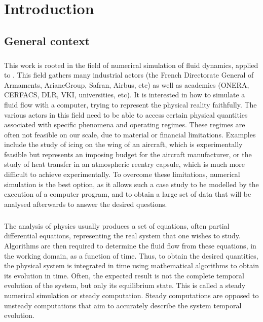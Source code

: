 \chapter*{Introduction}


  \section*{General context}

    \paragraph{}
    This work is rooted in the field of numerical simulation of fluid dynamics, applied to .
    This field gathers many industrial actors (the French Directorate General of Armaments, ArianeGroup, Safran, Airbus, etc) as well as academics (ONERA, CERFACS, DLR, VKI, universities, etc).
    It is interested in how to simulate a fluid flow with a computer, trying to represent the physical reality faithfully.
    The various actors in this field need to be able to access certain physical quantities associated with specific phenomena and operating regimes.
    These regimes are often not feasible on our scale, due to material or financial limitations.
    Examples include the study of icing on the wing of an aircraft, which is experimentally feasible but represents an imposing budget for the aircraft manufacturer, or the study of heat transfer in an atmospheric reentry capsule, which is much more difficult to achieve experimentally.
    To overcome these limitations, numerical simulation is the best option, as it allows such a case study to be modelled by the execution of a computer program, and to obtain a large set of data that will be analysed afterwards to answer the desired questions.

    \paragraph{}
    The analysis of physics usually produces a set of equations, often partial differential equations, representing the real system that one wishes to study.
    Algorithms are then required to determine the fluid flow from these equations, in the working domain, as a function of time.
    Thus, to obtain the desired quantities, the physical system is integrated in time using mathematical algorithms to obtain its evolution in time.
    Often, the expected result is not the complete temporal evolution of the system, but only its equilibrium state.
    This is called a steady numerical simulation or steady computation.
    Steady computations are opposed to unsteady computations that aim to accurately describe the system temporal evolution.

